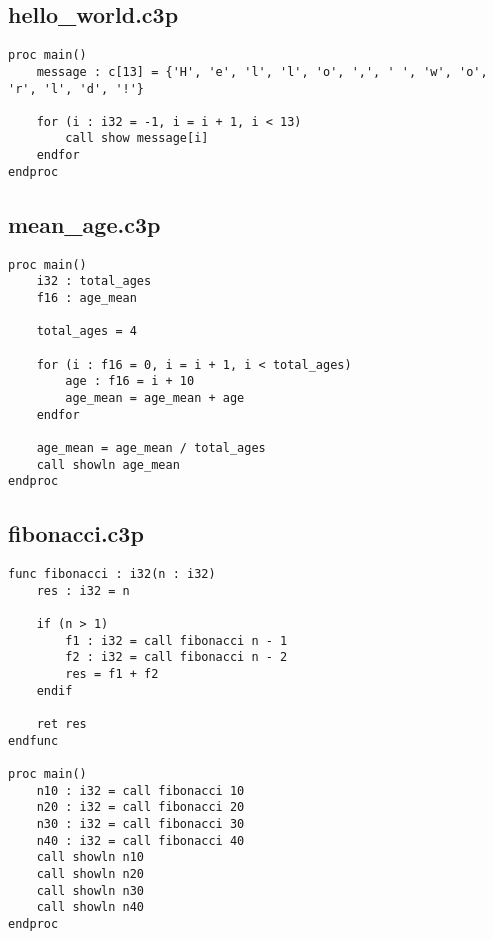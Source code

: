\subsection{hello\_world.c3p}

\begin{verbatim}
proc main()
    message : c[13] = {'H', 'e', 'l', 'l', 'o', ',', ' ', 'w', 'o', 'r', 'l', 'd', '!'}

    for (i : i32 = -1, i = i + 1, i < 13)
    	call show message[i]
    endfor
endproc
\end{verbatim}

\subsection{mean\_age.c3p}
\begin{verbatim}
proc main()
    i32 : total_ages
    f16 : age_mean

    total_ages = 4

    for (i : f16 = 0, i = i + 1, i < total_ages)
        age : f16 = i + 10
        age_mean = age_mean + age
    endfor

    age_mean = age_mean / total_ages
    call showln age_mean
endproc
\end{verbatim}

\subsection{fibonacci.c3p}

\begin{verbatim}
func fibonacci : i32(n : i32)
    res : i32 = n

    if (n > 1)
        f1 : i32 = call fibonacci n - 1
        f2 : i32 = call fibonacci n - 2
        res = f1 + f2
    endif

    ret res
endfunc

proc main()
    n10 : i32 = call fibonacci 10
    n20 : i32 = call fibonacci 20
    n30 : i32 = call fibonacci 30
    n40 : i32 = call fibonacci 40
    call showln n10
    call showln n20
    call showln n30
    call showln n40
endproc
\end{verbatim}
